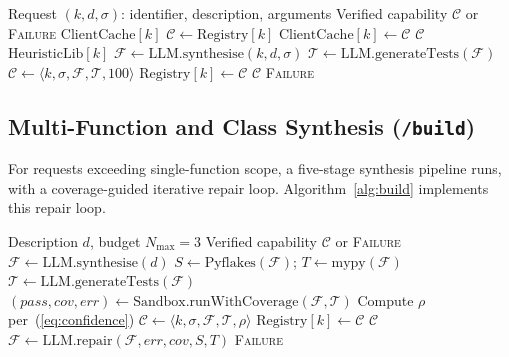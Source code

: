\documentclass[conference]{IEEEtran}
\begin{document}
\begin{algorithm}
\caption{Capability Acquisition (\texttt{/run})}
\label{alg:run}
\begin{algorithmic}[1]
\REQUIRE Request $(k, d, \sigma)$: identifier, description, arguments
\ENSURE Verified capability $\mathcal{C}$ or \textsc{Failure}
  \RETURN $\text{ClientCache}[k]$
\ENDIF
{}
  \STATE $\mathcal{C} \leftarrow \text{Registry}[k]$
  \STATE $\text{ClientCache}[k] \leftarrow \mathcal{C}$
  \RETURN $\mathcal{C}$
\ENDIF
{}
  \RETURN $\text{HeuristicLib}[k]$
\ENDIF
\STATE $\mathcal{F} \leftarrow \text{LLM.synthesise}(k, d, \sigma)$
\STATE $\mathcal{T} \leftarrow \text{LLM.generateTests}(\mathcal{F})$
  \STATE $\mathcal{C} \leftarrow \langle k, \sigma, \mathcal{F},
         \mathcal{T}, 100 \rangle$
  \STATE $\text{Registry}[k] \leftarrow \mathcal{C}$
  \RETURN $\mathcal{C}$
\ELSE
  \RETURN \textsc{Failure}
\ENDIF
\end{algorithmic}
\end{algorithm}

\subsection{Multi-Function and Class Synthesis (\texttt{/build})}
\label{subsec:build}

For requests exceeding single-function scope, a five-stage synthesis
pipeline runs, with a coverage-guided iterative repair loop.
Algorithm~\ref{alg:build} implements this repair loop.

\begin{algorithm}
\caption{Iterative Repair Loop (\texttt{/build})}
\label{alg:build}
\begin{algorithmic}[1]
\REQUIRE Description $d$, budget $N_{\max}=3$
\ENSURE Verified capability $\mathcal{C}$ or \textsc{Failure}
\STATE $\mathcal{F} \leftarrow \text{LLM.synthesise}(d)$
  \STATE $S \leftarrow \text{Pyflakes}(\mathcal{F})$; \quad
         $T \leftarrow \text{mypy}(\mathcal{F})$
  \STATE $\mathcal{T} \leftarrow \text{LLM.generateTests}(\mathcal{F})$
  \STATE $(pass, cov, err) \leftarrow
         \text{Sandbox.runWithCoverage}(\mathcal{F}, \mathcal{T})$
    \STATE Compute $\rho$ per~(\ref{eq:confidence})
    \STATE $\mathcal{C} \leftarrow \langle k, \sigma, \mathcal{F},
           \mathcal{T}, \rho \rangle$
    \STATE $\text{Registry}[k] \leftarrow \mathcal{C}$
    \RETURN $\mathcal{C}$
  \ENDIF
  \STATE $\mathcal{F} \leftarrow
         \text{LLM.repair}(\mathcal{F}, err, cov, S, T)$
\ENDFOR
\RETURN \textsc{Failure}
\end{algorithmic}
\end{algorithm}
\end{document}
